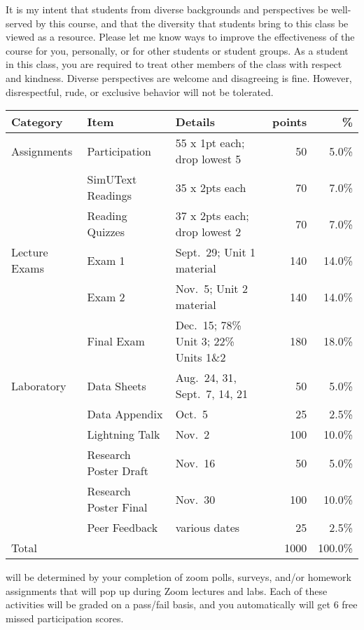 \documentclass{tufte-handout}
\begin{document}
\begin{fullwidth}
 It is my intent that students from diverse backgrounds and perspectives be well-served by this course, and that the diversity that students bring to this class be viewed as a resource. Please let me know ways to improve the effectiveness of the course for you, personally, or for other students or student groups. As a student in this class, you are required to treat other members of the class with respect and kindness. Diverse perspectives are welcome and disagreeing is fine. However, disrespectful, rude, or exclusive behavior will not be tolerated.


\end{fullwidth}


\begin{fullwidth}



\begin{table}
\begin{tabular}{l l l r r}
Category & Item & Details & points & \% \\
\hline
Assignments & Participation & 55 x 1pt each; drop lowest 5 & 50 & 5.0\% \\
& SimUText Readings   & 35 x 2pts each & 70 & 7.0\% \\
& Reading Quizzes  & 37 x 2pts each; drop lowest 2 & 70 & 7.0\% \\
\hline
Lecture Exams & Exam 1 & Sept.~29; Unit 1 material & 140 & 14.0\% \\
& Exam 2 & Nov.~5; Unit 2 material & 140 & 14.0\% \\
& Final Exam & Dec.~15; 78\% Unit 3; 22\% Units 1\&2 & 180 & 18.0\% \\ 		
\hline
Laboratory & Data Sheets & Aug.~24, 31, Sept.~7, 14, 21 & 50 & 5.0\% \\
& Data Appendix & Oct.~5 & 25 & 2.5\% \\
& Lightning Talk & Nov.~2 & 100 &  10.0\% \\
& Research Poster Draft & Nov.~16 & 50 & 5.0\% \\
& Research Poster Final & Nov.~30 & 100 & 10.0\% \\
& Peer Feedback & various dates & 25 & 2.5\% \\
\hline
Total & & & 1000 & 100.0\% 
\end{tabular}
\end{table}




\newpage

 will be determined by your completion of zoom polls, surveys, and/or homework assignments that will pop up during Zoom lectures and labs. Each of these activities will be graded on a pass/fail basis, and you automatically will get 6 free missed participation scores. 


\end{fullwidth}
\end{document}
